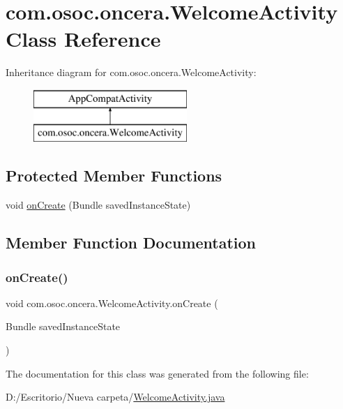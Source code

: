 \hypertarget{classcom_1_1osoc_1_1oncera_1_1_welcome_activity}{}\section{com.\+osoc.\+oncera.\+Welcome\+Activity Class Reference}
\label{classcom_1_1osoc_1_1oncera_1_1_welcome_activity}
Inheritance diagram for com.\+osoc.\+oncera.\+Welcome\+Activity\+:\begin{figure}[H]
\begin{center}
\leavevmode
\includegraphics[height=2.000000cm]{classcom_1_1osoc_1_1oncera_1_1_welcome_activity}
\end{center}
\end{figure}
\subsection*{Protected Member Functions}
\begin{DoxyCompactItemize}
\item 
void \mbox{\hyperlink{classcom_1_1osoc_1_1oncera_1_1_welcome_activity_a10e10a75390449381cc406c13b68e7ea}{on\+Create}} (Bundle saved\+Instance\+State)
\end{DoxyCompactItemize}


\subsection{Member Function Documentation}
\mbox{\label{classcom_1_1osoc_1_1oncera_1_1_welcome_activity_a10e10a75390449381cc406c13b68e7ea}} 
\subsubsection{\texorpdfstring{onCreate()}{onCreate()}}
{\footnotesize\ttfamily void com.\+osoc.\+oncera.\+Welcome\+Activity.\+on\+Create (\begin{DoxyParamCaption}\item[{Bundle}]{saved\+Instance\+State }\end{DoxyParamCaption})\hspace{0.3cm}{\ttfamily [protected]}}



The documentation for this class was generated from the following file\+:\begin{DoxyCompactItemize}
\item 
D\+:/\+Escritorio/\+Nueva carpeta/\mbox{\hyperlink{_welcome_activity_8java}{Welcome\+Activity.\+java}}\end{DoxyCompactItemize}
